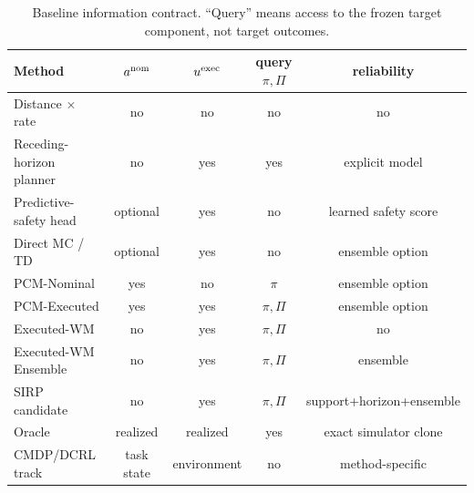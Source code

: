 \begin{table}[t]
\centering
\small
\caption{Baseline information contract. ``Query'' means access to the frozen target component, not target outcomes.}
\label{tab:baselines}
\begin{tabular}{lcccc}
\toprule
Method & $a^{\rm nom}$ & $u^{\rm exec}$ & query $\pi,\Pi$ & reliability \\
\midrule
Distance $\times$ rate & no & no & no & no \\
Receding-horizon planner & no & yes & yes & explicit model \\
Predictive-safety head & optional & yes & no & learned safety score \\
Direct MC / TD & optional & yes & no & ensemble option \\
PCM-Nominal & yes & no & $\pi$ & ensemble option \\
PCM-Executed & yes & yes & $\pi,\Pi$ & ensemble option \\
Executed-WM & no & yes & $\pi,\Pi$ & no \\
Executed-WM Ensemble & no & yes & $\pi,\Pi$ & ensemble \\
SIRP candidate & no & yes & $\pi,\Pi$ & support+horizon+ensemble \\
Oracle & realized & realized & yes & exact simulator clone \\
CMDP/DCRL track & task state & environment & no & method-specific \\
\bottomrule
\end{tabular}
\end{table}

